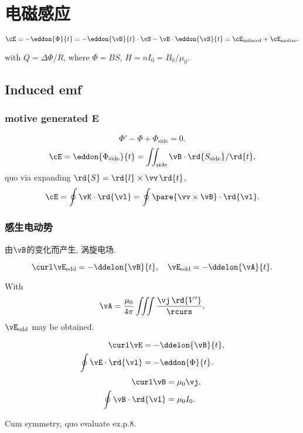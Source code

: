 \documentclass{ctexart}
\begin{document}
\section{电磁感应} %
\label{sec:电磁感应}

\[ \cE = -\eddon{\Phi}{t} = -\eddon{\vB}{t}\cdot\vS - \vB\cdot\eddon{\vS}{t} = \cE_{\mathrm{induced}} + \cE_{\mathrm{motive}}. \]
\begin{ex}[measurement of $\vM$ to $\vB$]
	with $Q = \Delta \Phi/R$, where $\Phi = BS$, $H = nI_0 = B_0/\mu_0$.
\end{ex}

\subsection{Induced emf} %
\label{sub:induced_emf}

\subsubsection{motive generated E} %
\label{ssub:motive_generated_e}

\[ \Phi' - \Phi + \Phi_{\mathrm{side}} = 0. \]
\[ \cE = \eddon{\Phi_{\mathrm{side}}}{t} = \iint_{\mathrm{side}} \vB\cdot\rd{S_{\mathrm{side}}}/\rd{t}, \]
quo via expanding $\rd{S} = \rd{l}\times \vv\,\rd{t}$,
\[ \cE = \oint \vK\cdot\rd{\vl} = \oint\pare{\vv\times\vB}\cdot\rd{\vl}. \]


\subsubsection{感生电动势} %
\label{ssub:感生电动势}

由$\vB$的变化而产生, 涡旋电场.
\begin{finale}
	\[ \curl \vE_{\mathrm{edd}} = -\ddelon{\vB}{t},\quad \vE_{\mathrm{edd}} = -\ddelon{\vA}{t}. \]
\end{finale}
With
\[ \vA = \frac{\mu_0}{4\pi} \iiint \frac{\vj\,\rd{V'}}{\rcurs}, \]
$\vE_{\mathrm{edd}}$ may be obtained.

\begin{multicols}{2}
	\noindent
	\begin{align*}
		\curl \vE &= - \ddelon{\vB}{t},\\
		\oint \vE\cdot\rd{\vl} &= -\eddon{\Phi}{t}.
	\end{align*}
	\begin{align*}
		\curl \vB &= \mu_0 \vj,\\
		\oint \vB\cdot\rd{\vl} &= \mu_0 I_0.
	\end{align*}
\end{multicols}
Cum symmetry, quo evaluate ex.p.8.
\end{document}
